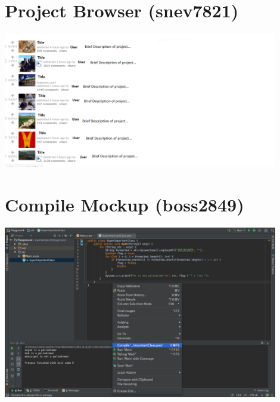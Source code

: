 \documentclass[11pt]{report}
\begin{document}
    \section{Project Browser (snev7821)}
    \begin{minipage}{1\textwidth}
        \begin{center}
            \includegraphics[width=0.9\textwidth]{mockups/mockup-project_browser-snev7821}
        \end{center}
    \end{minipage}
    
    \section{Compile Mockup (boss2849)}
    \begin{minipage}{1\textwidth}
        \begin{center}
            \includegraphics[width=0.9\textwidth]{mockups/mockup-compile-boss2849}
        \end{center}
    \end{minipage}
\end{document}
